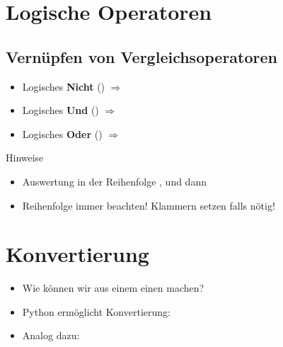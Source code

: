 \livecoding

\section{Logische Operatoren}
\subsection{Vernüpfen von Vergleichsoperatoren}
\begin{frame}
    \slidehead
    \begin{itemize}[<+(1)->]
        \item Logisches \textbf{Nicht} ()  $\Rightarrow$ 
        \item Logisches \textbf{Und} () $\Rightarrow$ 
        \item Logisches \textbf{Oder} ()  $\Rightarrow$ 
    \end{itemize}
    \pause
    \pause
    \begin{block}{Hinweise}
        \begin{itemize}[<+(1)->]
            \item Auswertung in der Reihenfolge ,  und dann 
            \item Reihenfolge immer beachten!
                Klammern setzen falls nötig!
        \end{itemize}
    \end{block}
\end{frame}

\livecoding

\section{Konvertierung}
\begin{frame}
    \slidehead
    \begin{itemize}[<+->]
        \item Wie können wir aus einem  einen  machen?
        \item Python ermöglicht Konvertierung: 
        \item Analog dazu: 
    \end{itemize}
\end{frame}

